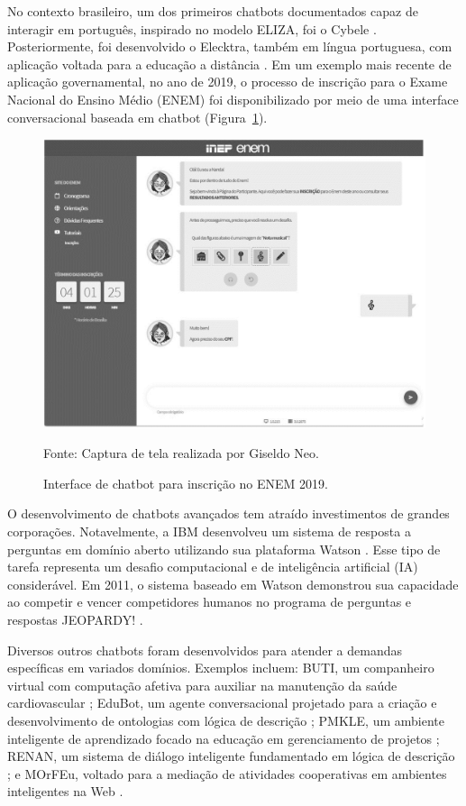 \documentclass[14pt,a4paper,oneside]{book}
\begin{document}
No contexto brasileiro, um dos primeiros chatbots documentados capaz de interagir em português, inspirado no modelo ELIZA, foi o Cybele \cite{primo2001chatterbot}. Posteriormente, foi desenvolvido o Elecktra, também em língua portuguesa, com aplicação voltada para a educação a distância \cite{Leonhardt2003}. Em um exemplo mais recente de aplicação governamental, no ano de 2019, o processo de inscrição para o Exame Nacional do Ensino Médio (ENEM) foi disponibilizado por meio de uma interface conversacional baseada em chatbot (Figura~\ref{fig:enem}).

\begin{figure}
	\centering
	\caption{Interface de chatbot para inscrição no ENEM 2019.}
	\includegraphics[width=0.5\linewidth]{./fig/enem.png}
	\label{fig:enem}
	{\footnotesize 
	
	Fonte: Captura de tela realizada por Giseldo Neo.}
\end{figure}

O desenvolvimento de chatbots avançados tem atraído investimentos de grandes corporações. Notavelmente, a IBM desenvolveu um sistema de resposta a perguntas em domínio aberto utilizando sua plataforma Watson \cite{Ferrucci2012}. Esse tipo de tarefa representa um desafio computacional e de inteligência artificial (IA) considerável. Em 2011, o sistema baseado em Watson demonstrou sua capacidade ao competir e vencer competidores humanos no programa de perguntas e respostas JEOPARDY! \cite{Ferrucci2012}.

Diversos outros chatbots foram desenvolvidos para atender a demandas específicas em variados domínios. Exemplos incluem: BUTI, um companheiro virtual com computação afetiva para auxiliar na manutenção da saúde cardiovascular \cite{Junior2008}; EduBot, um agente conversacional projetado para a criação e desenvolvimento de ontologias com lógica de descrição \cite{Lima2017}; PMKLE, um ambiente inteligente de aprendizado focado na educação em gerenciamento de projetos \cite{Torreao2005}; RENAN, um sistema de diálogo inteligente fundamentado em lógica de descrição \cite{AZEVEDO2015}; e MOrFEu, voltado para a mediação de atividades cooperativas em ambientes inteligentes na Web \cite{Bada2012}.
\end{document}
